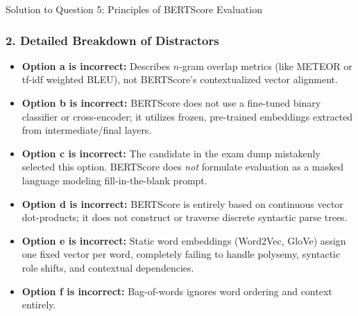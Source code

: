 \documentclass[11pt,a4paper]{article}
\begin{document}
\begin{solutionbox}{Solution to Question 5: Principles of BERTScore Evaluation}
\subsubsection*{2. Detailed Breakdown of Distractors}
\begin{itemize}[leftmargin=1.5em]
    \item \textbf{Option a is incorrect:} Describes $n$-gram overlap metrics (like METEOR or tf-idf weighted BLEU), not BERTScore's contextualized vector alignment.
    \item \textbf{Option b is incorrect:} BERTScore does not use a fine-tuned binary classifier or cross-encoder; it utilizes frozen, pre-trained embeddings extracted from intermediate/final layers.
    \item \textbf{Option c is incorrect:} The candidate in the exam dump mistakenly selected this option. BERTScore does \emph{not} formulate evaluation as a masked language modeling fill-in-the-blank prompt.
    \item \textbf{Option d is incorrect:} BERTScore is entirely based on continuous vector dot-products; it does not construct or traverse discrete syntactic parse trees.
    \item \textbf{Option e is incorrect:} Static word embeddings (Word2Vec, GloVe) assign one fixed vector per word, completely failing to handle polysemy, syntactic role shifts, and contextual dependencies.
    \item \textbf{Option f is incorrect:} Bag-of-words ignores word ordering and context entirely.
\end{itemize}
\end{solutionbox}
\end{document}
